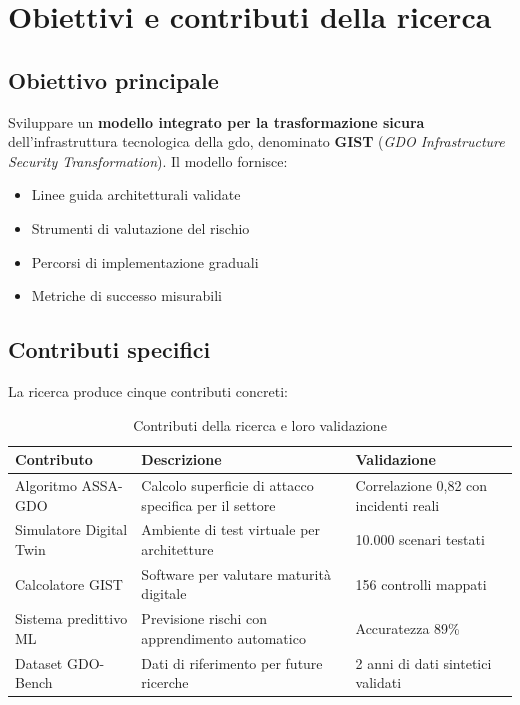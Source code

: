 \section{Obiettivi e contributi della ricerca}
\label{sec:obiettivi_contributi}

\subsection{Obiettivo principale}
\label{subsec:obiettivo_principale}

Sviluppare un \textbf{modello integrato per la trasformazione sicura} dell'infrastruttura tecnologica della \gls{gdo}, denominato \textbf{GIST} (\textit{GDO Infrastructure Security Transformation}). Il modello fornisce:

\begin{itemize}
\item Linee guida architetturali validate
\item Strumenti di valutazione del rischio
\item Percorsi di implementazione graduali
\item Metriche di successo misurabili
\end{itemize}

\subsection{Contributi specifici}
\label{subsec:contributi_specifici}

La ricerca produce cinque contributi concreti:

\begin{table}[htbp]
\centering
\caption{Contributi della ricerca e loro validazione}
\label{tab:contributi}
\begin{tabular}{|p{4cm}|p{5cm}|p{4cm}|}
\hline
\textbf{Contributo} & \textbf{Descrizione} & \textbf{Validazione} \\
\hline
Algoritmo ASSA-GDO & Calcolo superficie di attacco specifica per il settore & Correlazione 0,82 con incidenti reali \\
\hline
Simulatore Digital Twin & Ambiente di test virtuale per architetture & 10.000 scenari testati \\
\hline
Calcolatore GIST & Software per valutare maturità digitale & 156 controlli mappati \\
\hline
Sistema predittivo ML & Previsione rischi con apprendimento automatico & Accuratezza 89\% \\
\hline
Dataset GDO-Bench & Dati di riferimento per future ricerche & 2 anni di dati sintetici validati \\
\hline
\end{tabular}
\end{table}

